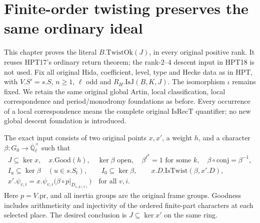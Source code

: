 \section{Finite-order twisting preserves the same ordinary ideal}
\label{sec:hida-twisting-v45}

This chapter proves the literal $B.\mathrm{TwistOk}(J)$, in every
original positive rank.  It reuses HPT17's ordinary return theorem;
the rank-$2$--$4$ descent input in HPT18 is not used.  Fix all
original Hida, coefficient, level, type and Hecke data as in HPT,
with $V.S'=s.S$, $n\geq1$, $\ell$ odd and
$R_H.\mathrm{IsJ}(B,K,J)$.  The isomorphism $\iota$ remains fixed.
We retain the same original global Artin, local classification,
local correspondence and period/monodromy foundations as before.
Every occurrence of a local correspondence means the complete
original $\mathrm{IsRecT}$ quantifier; no new global descent
foundation is introduced.

The exact input consists of two original points $x,x'$, a weight
$h$, and a character $\beta:G_0\to\overline{\mathbb Q}_\ell^\times$
such that
\[
 \begin{gathered}
 J\subseteq\ker x,\quad x.\mathrm{Good}(h),\quad
 \ker\beta\text{ open},\quad \beta^{\ell^k}=1\text{ for some }k,\quad
 \beta\circ\mathrm{conj}=\beta^{-1},\\
 I_u\subseteq\ker\beta\quad(u\in s.S_t),\qquad
 I_0\subseteq\ker\beta,\qquad
 x.D.\mathrm{IsTwist}(\beta,x'.D),\\
 x'.\psi_{v,i}=x.\psi_{v,i}
                 \bigl(\beta\circ p|_{D_{s.A(v)}}\bigr)
                                        \quad\text{for all }v,i.
 \end{gathered}                                                  \tag{HTS.1}
\]
Here $p=V.\mathrm{pr}$, and all inertia groups are the original
frame groups.  Goodness includes arithmeticity and injectivity
of the ordered finite-part characters at each selected place.
The desired conclusion is $J\subseteq\ker x'$ on the same ring.

